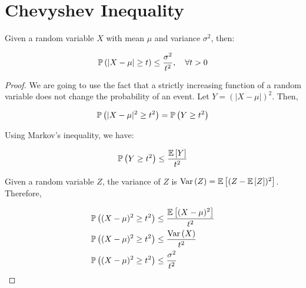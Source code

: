 \section{Chevyshev Inequality}

Given a random variable $X$ with mean $\mu$ and variance $\sigma^2$, then:

\begin{align*}
\mathbb{P}\left(|X - \mu| \geq t\right) \leq \frac{\sigma^2}{t^2}, \quad \forall t > 0
\end{align*}

\begin{proof}
We are going to use the fact that a strictly increasing function of a random variable does not change the probability of an event. Let $Y = (|X - \mu|)^2$. Then,

\begin{align*}
\mathbb{P}\left(|X - \mu|^2 \geq t^2\right) &= \mathbb{P}\left(Y \geq t^2\right) \\
\end{align*}

Using Markov's inequality, we have:

\begin{align*}
\mathbb{P}\left(Y \geq t^2\right) &\leq \frac{\mathbb{E}\left[Y\right]}{t^2} \\
\end{align*}

Given a random variable $Z$, the variance of $Z$ is $\text{Var}\left(Z\right) = \mathbb{E}\left[(Z - \mathbb{E}\left[Z\right])^2\right]$. Therefore,

\begin{align*}
\mathbb{P}\left((X - \mu)^2 \geq t^2\right) &\leq \frac{\mathbb{E}\left[(X - \mu)^2\right]}{t^2} \\
\mathbb{P}\left((X - \mu)^2 \geq t^2\right) &\leq \frac{\text{Var}\left(X\right)}{t^2} \\
\mathbb{P}\left((X - \mu)^2 \geq t^2\right) &\leq \frac{\sigma^2}{t^2} \\
\end{align*}

\end{proof}
